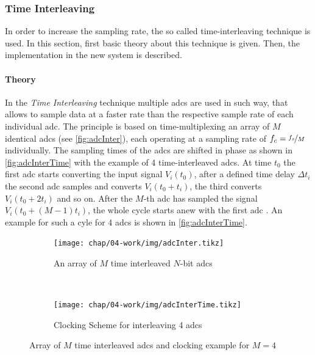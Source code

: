 \subsubsection{Time Interleaving}\label{sssec:time-interleaving}
In order to increase the sampling rate, the so called time-interleaving technique is used. In this section, first basic theory about this technique is given. Then, the implementation in the new system is described.

\paragraph{Theory}
In the \textit{Time Interleaving} technique multiple \glspl{adc} are used in such way, that allows to sample data at a faster rate than the respective sample rate of each individual \gls{adc}. 
The principle is based on time-multiplexing an array of $M$ identical \glspl{adc} (see \autoref{fig:adcInter}), each operating at a sampling rate of $f_c = \nicefrac{f_s}{M}$ individually. 
The sampling times of the \glspl{adc} are shifted in phase as shown in \autoref{fig:adcInterTime} with the example of 4 time-interleaved \glspl{adc}.  
At time $t_0$ the first \gls{adc} starts converting the input signal $V_i(t_0)$, after a defined time delay $\Delta t_i$ the second \gls{adc} samples and converts $V_i(t_0 + t_i)$, the third converts $V_i(t_0 + 2t_i)$ and so on. 
After the $M$-th \gls{adc} has sampled the signal $V_i(t_0 + (M-1)t_i)$, the whole cycle starts anew with the first \gls{adc} \cite{mangrob}.
An example for such a cyle for 4 \glspl{adc} is shown in \autoref{fig:adcInterTime}.

\begin{figure}[tbh]
	\centering
	\begin{subfigure}{\textwidth}
		\centering
		\texttt{[image: chap/04-work/img/adcInter.tikz]}  
		\caption{An array of $M$ time interleaved $N$-bit \glspl{adc} \cite{mangrob}}
		\label{fig:adcInter}
	\end{subfigure}
	\\[4ex]
	\begin{subfigure}{\textwidth}
		\centering
		\tikzexternaldisable
		\texttt{[image: chap/04-work/img/adcInterTime.tikz]}  
		\caption{Clocking Scheme for interleaving 4 \glspl{adc}}
		\tikzexternalenable
		\label{fig:adcInterTime}
	\end{subfigure}
	\caption[Time-Interleaving Method]{Array of $M$ time interleaved \glspl{adc} and clocking example for $M = 4$}
	\label{fig:interleaving}
\end{figure}


